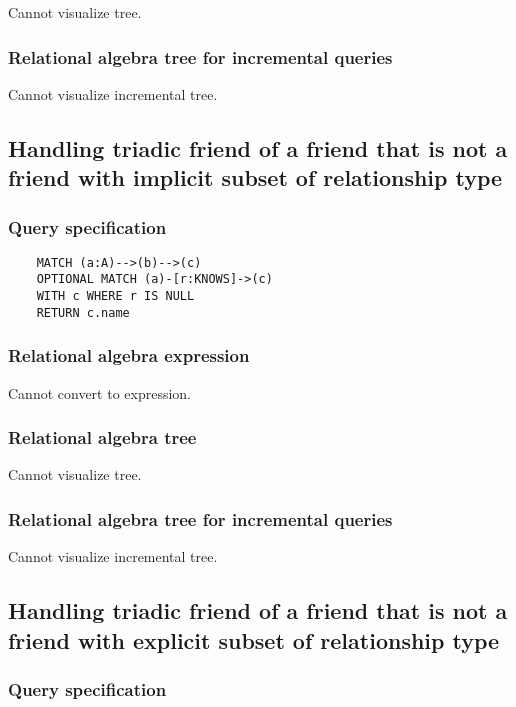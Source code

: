 	Cannot visualize tree.

	\subsubsection*{Relational algebra tree for incremental queries}

	Cannot visualize incremental tree.
	\subsection{Handling triadic friend of a friend that is not a friend with implicit subset of relationship type}

	\subsubsection*{Query specification}

	\begin{lstlisting}
	MATCH (a:A)-->(b)-->(c)
	OPTIONAL MATCH (a)-[r:KNOWS]->(c)
	WITH c WHERE r IS NULL
	RETURN c.name
	\end{lstlisting}


	\subsubsection*{Relational algebra expression}

	Cannot convert to expression.

	\subsubsection*{Relational algebra tree}

	Cannot visualize tree.

	\subsubsection*{Relational algebra tree for incremental queries}

	Cannot visualize incremental tree.
	\subsection{Handling triadic friend of a friend that is not a friend with explicit subset of relationship type}

	\subsubsection*{Query specification}

